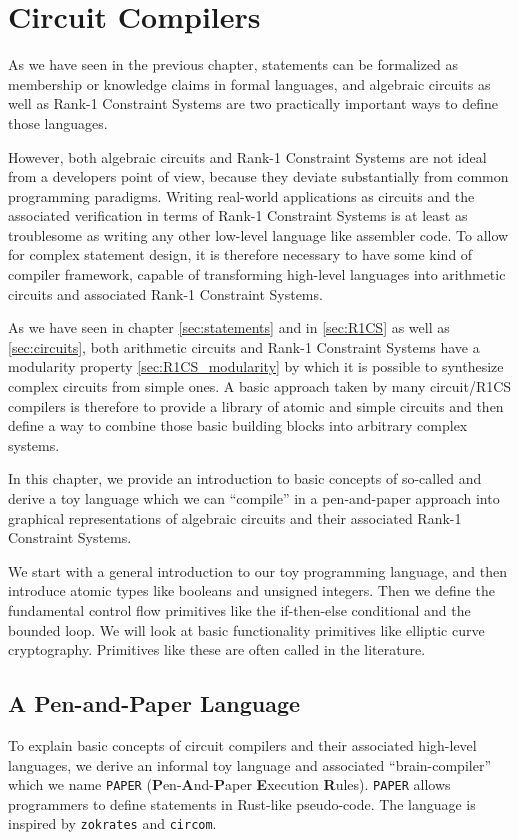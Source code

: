 \chapter{Circuit Compilers}\label{chap:circuit-compilers}
As we have seen in the previous chapter, statements can be formalized as membership or knowledge claims in formal languages, and algebraic circuits as well as Rank-1 Constraint Systems are two practically important ways to define those languages.

However, both algebraic circuits and Rank-1 Constraint Systems are not ideal from a developers point of view, because they deviate substantially from common programming paradigms. Writing real-world applications as circuits and the associated verification in terms of Rank-1 Constraint Systems is at least as troublesome as writing any other low-level language like assembler code. To allow for complex statement design, it is therefore necessary to have some kind of compiler framework, capable of transforming high-level languages into arithmetic circuits and associated Rank-1 Constraint Systems. 

As we have seen in chapter \ref{sec:statements} and in \ref{sec:R1CS} as well as \ref{sec:circuits}, both arithmetic circuits and Rank-1 Constraint Systems have a modularity property \ref{sec:R1CS_modularity} by which it is possible to synthesize complex circuits from simple ones. A basic approach taken by many circuit/R1CS compilers is therefore to provide a library of atomic and simple circuits and then define a way to combine those basic building blocks into arbitrary complex systems.

In this chapter, we provide an introduction to basic concepts of so-called  and derive a toy language which we can ``compile'' in a pen-and-paper approach into graphical representations of algebraic circuits and their associated Rank-1 Constraint Systems.

We start with a general introduction to our toy programming language, and then introduce atomic types like booleans and unsigned integers. Then we define the fundamental control flow primitives like the if-then-else conditional and the bounded loop. We will look at basic functionality primitives like elliptic curve cryptography. Primitives like these are often called  in the literature. 
\section{A Pen-and-Paper Language} To explain basic concepts of circuit compilers and their associated high-level languages, we derive an informal toy language and associated ``brain-compiler'' which we name \texttt{PAPER} (\textbf{P}en-\textbf{A}nd-\textbf{P}aper \textbf{E}xecution \textbf{R}ules). \texttt{PAPER} allows programmers to define statements in Rust-like pseudo-code. The language is inspired by \texttt{zokrates} and \texttt{circom}.
 
